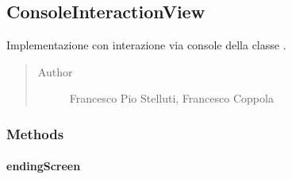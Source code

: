 \documentclass[letterpaper,10pt,italian,openany,oneside]{sphinxmanual}
\begin{document}
\subsection{ConsoleInteractionView}
\label{\detokenize{source/it/unicam/cs/pa/mastermind/ui/ConsoleInteractionView:consoleinteractionview}}\label{\detokenize{source/it/unicam/cs/pa/mastermind/ui/ConsoleInteractionView::doc}}

\begin{fulllineitems}
\label{\detokenize{source/it/unicam/cs/pa/mastermind/ui/ConsoleInteractionView:it.unicam.cs.pa.mastermind.ui.ConsoleInteractionView}}
Implementazione con interazione via console della classe .
\begin{quote}\begin{description}
\item[{Author}] \leavevmode
Francesco Pio Stelluti, Francesco Coppola

\end{description}\end{quote}

\end{fulllineitems}



\subsubsection{Methods}
\label{\detokenize{source/it/unicam/cs/pa/mastermind/ui/ConsoleInteractionView:methods}}

\paragraph{endingScreen}
\label{\detokenize{source/it/unicam/cs/pa/mastermind/ui/ConsoleInteractionView:endingscreen}}

\begin{fulllineitems}
\label{\detokenize{source/it/unicam/cs/pa/mastermind/ui/ConsoleInteractionView:it.unicam.cs.pa.mastermind.ui.ConsoleInteractionView.endingScreen(String)}}
\end{fulllineitems}
\end{document}
